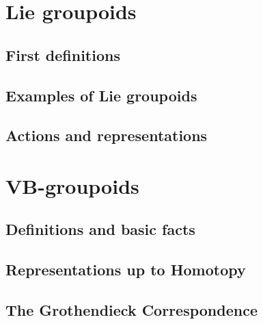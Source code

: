 
\chapter{Lie groupoids}\label{ch:lie-gpds}

\section{First definitions}



\section{Examples of Lie groupoids}



\section{Actions and representations}






\chapter{VB-groupoids}\label{ch:vb-gpds}

\section{Definitions and basic facts}\label{sec:VBgpds}



\section{Representations up to Homotopy}



\section{The Grothendieck Correspondence}\label{sec:groth-corresp}

